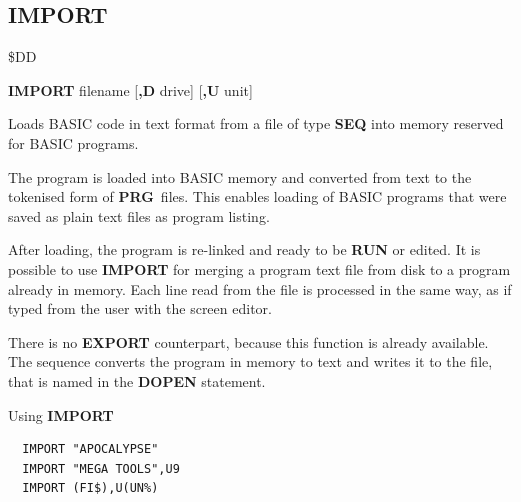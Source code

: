 \newpage
\subsection{IMPORT}
\begin{description}[leftmargin=2cm,style=nextline]
\item [Token:] \$DD
\item [Format:] {\bf IMPORT} filename [{\bf,D} drive] [{\bf,U} unit]
\item [Usage:]
   Loads BASIC code in text format from a file of type
   {\bf SEQ} into memory reserved for BASIC programs.

   \filenamedefinition

   \drivedefinition

   \unitdefinition

\item [Remarks:]
   The program is loaded into BASIC memory and converted from text to the
   tokenised form of {\bf PRG} files. This enables loading of BASIC programs
   that were saved as plain text files as program listing.

   After loading, the program is re-linked
   and ready to be {\bf RUN} or edited.
   It is possible to use {\bf IMPORT} for merging a program text file
   from disk to a program already in memory.
   Each line read from the file is processed in the same way,
   as if typed from the user with the screen editor.

   There is no {\bf EXPORT} counterpart, because this function is
   already available. The sequence
   converts the program in memory to text and writes it to the
   file, that is named in the {\bf DOPEN} statement.

\item [Examples:] Using {\bf IMPORT}
\begin{tcolorbox}[colback=black,coltext=white]
\verbatimfont{\codefont}
\begin{verbatim}
  IMPORT "APOCALYPSE"
  IMPORT "MEGA TOOLS",U9
  IMPORT (FI$),U(UN%)
\end{verbatim}
\end{tcolorbox}
\end{description}


\newpage
